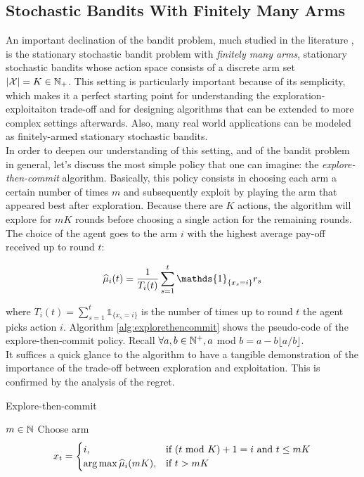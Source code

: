 \subsection{Stochastic Bandits With Finitely Many Arms} \label{finiteMABs}
An important declination of the bandit problem, much studied in the literature \cite{lattimore2019bandit}, is the stationary stochastic bandit problem with \emph{finitely many arms}, \ie stationary stochastic bandits whose action space consists of a discrete arm set $|\mathcal{X}| = K \in \mathbb{N}_{+}$. This setting is particularly important because of its semplicity, which makes it a perfect starting point for understanding the exploration-exploitaiton trade-off and for designing algorithms that can be extended to more complex settings afterwards. Also, many real world applications can be modeled as finitely-armed stationary stochastic bandits. \\ In order to deepen our understanding of this setting, and of the bandit problem in general, let's discuss the most simple policy that one can imagine: the \emph{explore-then-commit} algorithm. Basically, this policy consists in choosing each arm a certain number of times $m$ and subsequently exploit by playing the arm that appeared best after exploration. Because there are $K$ actions, the algorithm will explore for $mK$ rounds before choosing a single action for the remaining rounds. The choice of the agent goes to the arm $i$ with the highest average pay-off received up to round $t$:

\begin{equation}
\wh{\mu}_i(t) = \frac{1}{T_i(t)}\sum_{s=1}^{t}\mathds{1}_{\{x_s=i\}}r_s \label{eq:averagereward}
\end{equation}

where $T_i(t)= \sum_{s=1}^{t}\mathds{1}_{\{x_s=i\}}$ is the number of times up to round $t$ the agent picks action $i$. Algorithm \ref{alg:explorethencommit} shows the pseudo-code of the explore-then-commit policy. Recall $\forall a,b\in\mathbb{N}^{+},a$ mod $b = a-b\lfloor a/b\rfloor$. \\ It suffices a quick glance to the algorithm to have a tangible demonstration of the importance of the trade-off between exploration and exploitation. This is confirmed by the analysis of the regret.

\begin{algorithm}[t]
	\caption{Explore-then-commit}
	\label{alg:explorethencommit}
	\begin{algorithmic}[1]
	 $m\in\mathbb{N}$
		\State Choose arm \begin{equation*} x_t = \begin{cases}i, &\text{if $(t$ mod $K)+1=i$ and $t\leq mK$} \\ \arg\max\widehat{\mu}_i(mK), &\text{if } t>mK\end{cases} \end{equation*}
	\EndFor
	\end{algorithmic}
\end{algorithm}

